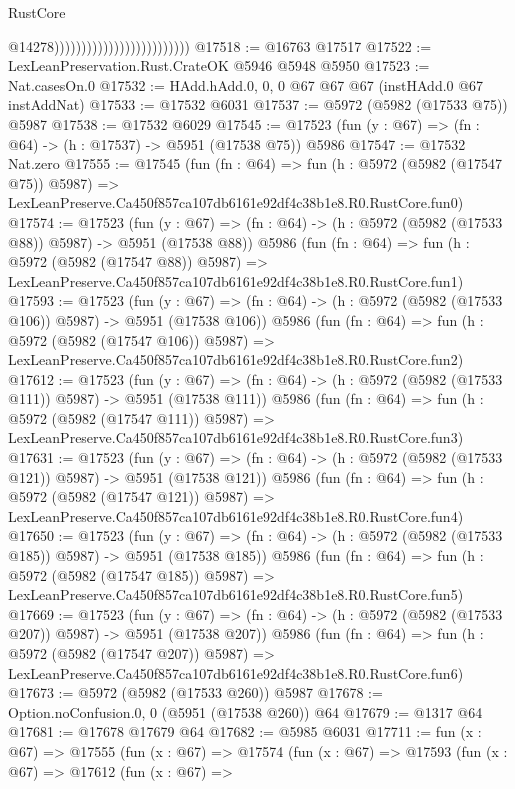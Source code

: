 \begin{lexlean}{RustCore}
\begin{coremodule}
                                                      @14278)))))))))))))))))))))))))
@17518 := @16763 @17517
@17522 := LexLeanPreservation.Rust.CrateOK @5946 @5948 @5950
@17523 := Nat.casesOn.{0}
@17532 := HAdd.hAdd.{0, 0, 0} @67 @67 @67 (instHAdd.{0} @67 instAddNat)
@17533 := @17532 @6031
@17537 := @5972 (@5982 (@17533 @75)) @5987
@17538 := @17532 @6029
@17545 := @17523 (fun (y : @67) => (fn : @64) -> (h : @17537) -> @5951 (@17538 @75)) @5986
@17547 := @17532 Nat.zero
@17555 := @17545
    (fun (fn : @64) =>
    fun (h : @5972 (@5982 (@17547 @75)) @5987) =>
    LexLeanPreserve.Ca450f857ca107db6161e92df4c38b1e8.R0.RustCore.fun0)
@17574 := @17523
    (fun (y : @67) => (fn : @64) -> (h : @5972 (@5982 (@17533 @88)) @5987) -> @5951 (@17538 @88))
    @5986
    (fun (fn : @64) =>
    fun (h : @5972 (@5982 (@17547 @88)) @5987) =>
    LexLeanPreserve.Ca450f857ca107db6161e92df4c38b1e8.R0.RustCore.fun1)
@17593 := @17523
    (fun (y : @67) => (fn : @64) -> (h : @5972 (@5982 (@17533 @106)) @5987) -> @5951 (@17538 @106))
    @5986
    (fun (fn : @64) =>
    fun (h : @5972 (@5982 (@17547 @106)) @5987) =>
    LexLeanPreserve.Ca450f857ca107db6161e92df4c38b1e8.R0.RustCore.fun2)
@17612 := @17523
    (fun (y : @67) => (fn : @64) -> (h : @5972 (@5982 (@17533 @111)) @5987) -> @5951 (@17538 @111))
    @5986
    (fun (fn : @64) =>
    fun (h : @5972 (@5982 (@17547 @111)) @5987) =>
    LexLeanPreserve.Ca450f857ca107db6161e92df4c38b1e8.R0.RustCore.fun3)
@17631 := @17523
    (fun (y : @67) => (fn : @64) -> (h : @5972 (@5982 (@17533 @121)) @5987) -> @5951 (@17538 @121))
    @5986
    (fun (fn : @64) =>
    fun (h : @5972 (@5982 (@17547 @121)) @5987) =>
    LexLeanPreserve.Ca450f857ca107db6161e92df4c38b1e8.R0.RustCore.fun4)
@17650 := @17523
    (fun (y : @67) => (fn : @64) -> (h : @5972 (@5982 (@17533 @185)) @5987) -> @5951 (@17538 @185))
    @5986
    (fun (fn : @64) =>
    fun (h : @5972 (@5982 (@17547 @185)) @5987) =>
    LexLeanPreserve.Ca450f857ca107db6161e92df4c38b1e8.R0.RustCore.fun5)
@17669 := @17523
    (fun (y : @67) => (fn : @64) -> (h : @5972 (@5982 (@17533 @207)) @5987) -> @5951 (@17538 @207))
    @5986
    (fun (fn : @64) =>
    fun (h : @5972 (@5982 (@17547 @207)) @5987) =>
    LexLeanPreserve.Ca450f857ca107db6161e92df4c38b1e8.R0.RustCore.fun6)
@17673 := @5972 (@5982 (@17533 @260)) @5987
@17678 := Option.noConfusion.{0, 0} (@5951 (@17538 @260)) @64
@17679 := @1317 @64
@17681 := @17678 @17679 @64
@17682 := @5985 @6031
@17711 := fun (x : @67) =>
  @17555
    (fun (x : @67) =>
    @17574
      (fun (x : @67) =>
      @17593
        (fun (x : @67) =>
        @17612
          (fun (x : @67) =>

\end{coremodule}
\end{lexlean}

